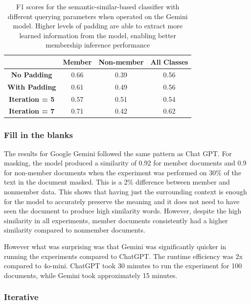 \documentclass[sigconf]{acmart}
\begin{document}
\begin{table}[]
\begin{tabular}{|c|c|c|c|}
\hline
                             & \textbf{Member} & \textbf{Non-member} & \textbf{All Classes} \\ \hline
\textbf{No Padding}          & 0.66               & 0.39                   & 0.56                    \\ \hline
\textbf{With Padding}        & 0.61               & 0.49                   & 0.56                    \\ \hline
\textbf{Iteration = 5} & 0.57               & 0.51                   & 0.54                    \\ \hline
\textbf{Iteration = 7} & 0.71               & 0.42                   & 0.62                    \\ \hline
\end{tabular}
\caption{F1 scores for the semantic-similar-based classifier with different querying parameters when operated on the Gemini model. Higher levels of padding are able to extract more learned information from the model, enabling better membership inference performance}
\label{tab:gemini_f1_table}
\end{table}

\subsubsection{Fill in the blanks}

The results for Google Gemini followed the same pattern as Chat GPT. For masking, the model produced a similarity of 0.92 for member documents and 0.9 for non-member documents when the experiment was performed on 30\% of the text in the document masked. This is a 2\% difference between member and nonmember data. This shows that having just the surrounding context is enough for the model to accurately preserve the meaning and it does not need to have seen the document to produce high similarity words. However, despite the high similarity in all experiments, member documents consistently had a higher similarity compared to nonmember documents. 


However what was surprising was that Gemini was significantly quicker in running the experiments compared to ChatGPT. The runtime efficiency was 2x compared to 4o-mini. ChatGPT took 30 minutes to run the experiment for 100 documents, while Gemini took approximately 15 minutes. 

\subsubsection{Iterative}
\end{document}
